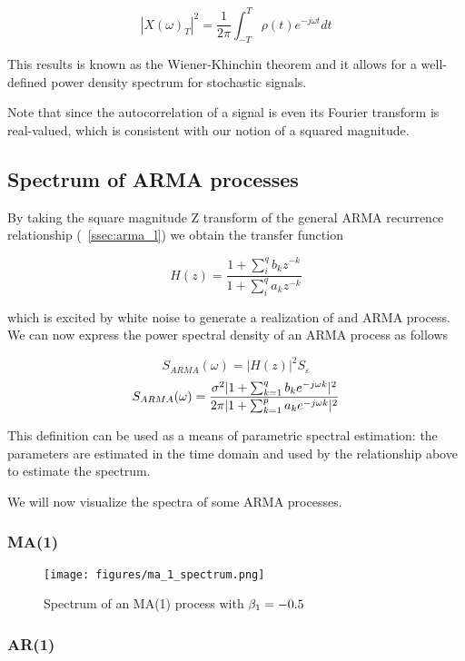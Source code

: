 $$|X(\omega)_T|^2 = \frac{1}{2\pi}\int_{-T}^{T} \rho(t)e^{-j \omega t}dt$$

This results is known as the Wiener-Khinchin theorem and it allows for a
well-defined power density spectrum for stochastic signals.

Note that since the autocorrelation of a signal is even its Fourier transform
is real-valued, which is consistent with our notion of a squared magnitude.

\subsection{Spectrum of ARMA processes}

By taking the square magnitude Z transform of the general ARMA recurrence
relationship (~\ref{ssec:arma_l}) we obtain the transfer function

$$ H(z) = \frac{1 + \sum_{i}^{q} b_k z^{-k}}{1 + \sum_{i}^{q} a_k z^{-k}} $$

which is excited by white noise to generate a realization of and ARMA
process. We can now express the power spectral density of an ARMA process as
follows

$$ S_{ARMA}(\omega) = |H(z)|^2 S_{\varepsilon} $$
\begin{equation}\label{eq:arma_spectrum}
     S_{ARMA}(\omega) = \frac{\sigma^2 |1 + \sum_{k=1}^{q} b_k e^{-j\omega k}|^2}{2\pi|1 + \sum_{k=1}^{p} a_k e^{-j\omega k}|^2} $$
\end{equation}

This definition can be used as a means of parametric spectral estimation: the
parameters are estimated in the time domain and used by the relationship
above to estimate the spectrum.

We will now visualize the spectra of some ARMA processes.

\subsubsection{MA(1)}

\begin{figure}[H]
    \centering
    \texttt{[image: figures/ma\_1\_spectrum.png]}
    \caption{Spectrum of an MA(1) process with
    $\protect \beta_1 = -0.5$}
    \label{fig:ma_1_spectrum}
\end{figure}

\subsubsection{AR(1)}


